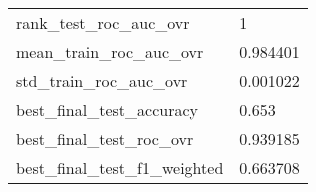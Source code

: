 \begin{tabular}{ll}
rank\_test\_roc\_auc\_ovr       &                                                  1 \\
mean\_train\_roc\_auc\_ovr      &                                           0.984401 \\
std\_train\_roc\_auc\_ovr       &                                           0.001022 \\
best\_final\_test\_accuracy    &                                              0.653 \\
best\_final\_test\_roc\_ovr     &                                           0.939185 \\
best\_final\_test\_f1\_weighted &                                           0.663708 \\
\bottomrule
\end{tabular}
